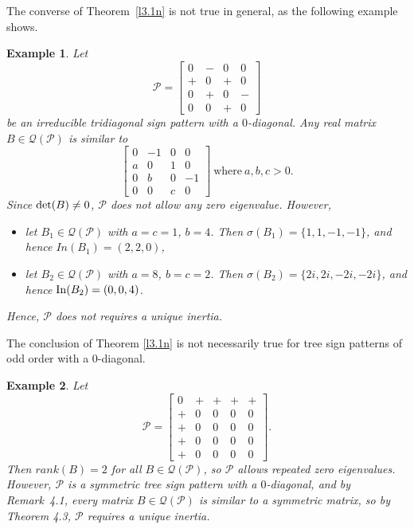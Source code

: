\documentclass[a4paper, 10pt]{article}
\newtheorem{eg}{Example}[section]
\numberwithin{equation}{section}
\def\det{{\rm det}}
\def\In{{\rm In}}
\begin{document}
	The converse of Theorem~\ref{l3.1n} is not true in general, as the following example shows.
	\begin{eg} Let $$\mathcal{P}=\begin{bmatrix}
			0&-&0&0\\ +&0&+&0\\ 0&+&0&-\\ 0&0&+&0
		\end{bmatrix}$$ be an irreducible tridiagonal sign pattern with a $0$-diagonal. Any real matrix $B\in \mathcal{Q}(\mathcal{P})$ is similar to	$$\begin{bmatrix}
			0&-1&0&0\\ a&0&1&0\\ 0&b&0&-1\\ 0&0&c&0
		\end{bmatrix}~\text{where} ~a,b,c>0.$$ Since $\det(B)\neq 0$, $\mathcal{P}$ does not allow any zero eigenvalue. However,
		\begin{itemize}
			\item[i.] let $B_1 \in \mathcal{Q}(\mathcal{P})$ with $a=c=1$, $b=4$. Then $\sigma(B_1)=\{1, 1, -1,-1\}$, and hence $In(B_1)=(2,2,0)$,
			\item[ii.] let $B_2 \in \mathcal{Q}(\mathcal{P})$ with $a=8$, $b=c=2$. Then $\sigma(B_2)=\{2i,2i, -2i,  -2i\}$, and hence $\In(B_2) = (0, 0, 4)$.
		\end{itemize} Hence, $\mathcal{P}$ does not requires a unique inertia.
	\end{eg}
	
	
	
	The conclusion of Theorem \ref{l3.1n} is not necessarily true for tree sign patterns of odd order with a $0$-diagonal.
	\begin{eg}
		Let $$\mathcal{P}=\begin{bmatrix}
			0&+&+&+&+\\+&0&0&0&0\\+&0&0&0&0\\+&0&0&0&0\\+&0&0&0&0
		\end{bmatrix}.$$ Then $rank(B)=2$ for all $B\in \mathcal{Q}(\mathcal{P})$, so $\mathcal{P}$ allows repeated zero eigenvalues. However, $\mathcal{P}$ is a symmetric tree sign pattern with a $0$-diagonal, and by Remark~4.1\cite{2018}, every matrix $B\in\mathcal{Q}(\mathcal{P})$ is similar to a symmetric matrix, so by Theorem 4.3\cite{2001}, $\mathcal{P}$ requires a unique inertia.
	\end{eg}
	
\end{document}
